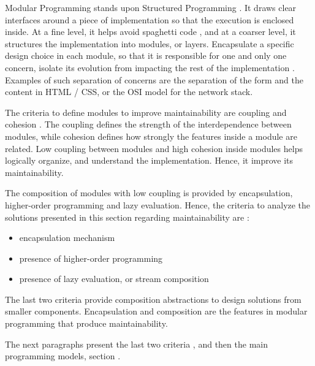 Modular Programming stands upon Structured Programming \cite{Dijkstra1970}.
It draws clear interfaces around a piece of implementation so that the execution is enclosed inside.
At a fine level, it helps avoid spaghetti code \cite{Dijkstra1968a}, and at a coarser level, it structures the implementation \cite{Dijkstra1968} into modules, or layers.
Encapsulate a specific design choice in each module, so that it is responsible for one and only one concern, isolate its evolution from impacting the rest of the implementation \cite{Parnas1972, Tarr1999, Hursch1995}.
Examples of such separation of concerns are the separation of the form and the content in HTML / CSS, or the OSI model for the network stack.

The criteria to define modules to improve maintainability are coupling and cohesion \cite{Stevens1974}.
The coupling defines the strength of the interdependence between modules, while cohesion defines how strongly the features inside a module are related.
Low coupling between modules and high cohesion inside modules helps logically organize, and understand the implementation.
Hence, it improve its maintainability.

The composition of modules with low coupling is provided by encapsulation, higher-order programming and lazy evaluation.
Hence, the criteria to analyze the solutions presented in this section regarding maintainability are :
\begin{itemize}
\item encapsulation mechanism
\item presence of higher-order programming
\item presence of lazy evaluation, or stream composition
\end{itemize}
The last two criteria provide composition abstractions to design solutions from smaller components.
Encapsulation and composition are the features in modular programming that produce maintainability.

The next paragraphs present the last two criteria \label{chapter3:software-maintainability:modularity:programming-models}, and  then the main programming models, section \label{chapter3:software-maintainability:modularity:programming-models}.

